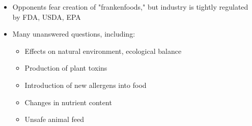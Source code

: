 \documentclass[12pt]{article}
\begin{document}
\begin{itemize}
                    \begin{itemize}
                        \item Opponents fear creation of "frankenfoods," but industry is tightly regulated by FDA, USDA, EPA
                        \item Many unanswered questions, including:
                            \begin{itemize}
                                \item Effects on natural environment, ecological balance
                                \item Production of plant toxins
                                \item Introduction of new allergens into food
                                \item Changes in nutrient content
                                \item Unsafe animal feed
                            \end{itemize}
                    \end{itemize}
            \end{itemize}
\end{document}
